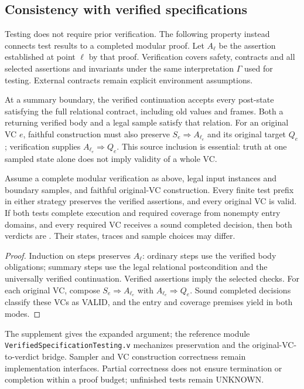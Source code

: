 \subsection{Consistency with verified specifications}
\label{sec:mode-correspondence}
Testing does not require prior verification. The following property instead
connects test results to a completed modular proof.
Let $A_\ell$ be the assertion established at point $\ell$ by that proof.
Verification covers safety, contracts and all selected assertions and
invariants under the same interpretation $\Gamma$ used for testing.
External contracts remain explicit environment assumptions.

At a summary boundary, the verified continuation accepts every post-state
satisfying the full relational contract, including old values and frames.
Both a returning verified body and a legal sample satisfy that relation.
For an original VC $e$, faithful construction must also preserve
$S_e\Rightarrow A_{\ell_e}$ and its original target $Q_e$; verification
supplies $A_{\ell_e}\Rightarrow Q_e$. This source inclusion is essential:
truth at one sampled state alone does not imply validity of a whole VC.

\begin{theorem}
\label{thm:mode-correspondence}
Assume a complete modular verification as above, legal input instances and
boundary samples, and faithful original-VC construction.
Every finite test prefix in either strategy preserves the verified
assertions, and every original VC is valid.
If both tests complete execution and required coverage from nonempty entry
domains, and every required VC receives a sound completed decision, then
both verdicts are \pass{}. Their states, traces and sample choices may differ.
\end{theorem}
\begin{proof}
Induction on steps preserves $A_\ell$: ordinary steps use the verified body
obligations; summary steps use the legal relational postcondition and the
universally verified continuation. Verified assertions imply the selected
checks. For each original VC, compose $S_e\Rightarrow A_{\ell_e}$ with
$A_{\ell_e}\Rightarrow Q_e$. Sound completed decisions classify these VCs
as VALID, and the entry and coverage premises yield \pass{} in both modes.
\end{proof}

The supplement gives the expanded argument; the reference module
\texttt{VerifiedSpecificationTesting.v} mechanizes preservation and the
original-VC-to-verdict bridge. Sampler and VC construction correctness
remain implementation interfaces. Partial correctness does not ensure
termination or completion within a proof budget; unfinished tests remain
UNKNOWN.
